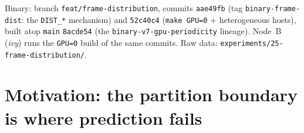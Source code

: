 \documentclass[
	english,
	letterpaper, oneside
]{article}
\begin{document}
\templatePagecfg
\templateFinalcfg

\inserttitle

\begin{center}\small\textsf{%
Binary: branch \texttt{feat/frame-distribution}, commits \texttt{aae49fb}
(tag \texttt{binary-frame-dist}: the \texttt{DIST\_*} mechanism) and
\texttt{52c40c4} (\texttt{make GPU=0} + heterogeneous hosts), built atop
\texttt{main} \texttt{8acde54} (the \texttt{binary-v7-gpu-periodicity}
lineage). Node~B (\emph{ivy}) runs the \texttt{GPU=0} build of the same
commits. Raw data: \texttt{experiments/25-frame-distribution/}.%
}\end{center}

\begin{abstract}
This report adds the first multi-machine axis to the renderer: frames of the
interpolated sequence are distributed \emph{across} nodes by a static
cyclic/block-cyclic predicate (three environment variables, one line in the
frame loop), while the region-level work queue stays intra-node and
untouched. Correctness is settled first: on the production spec (100 frames,
$1920\times1080$, \texttt{diffT}\,=\,0.1), every executor-pinned check ---
three simulated local nodes in CPU-only cyclic, GPU-only cyclic, and CPU-only
block-cyclic(8), plus a real two-machine run over SSH --- reproduces the
single-process output \textbf{100/100 frames byte-identical}, including
across compilers and microarchitectures (g++-15/Coffee~Lake vs.\
g++~16/Haswell). The benchmark is the honest half: against a laptop-alone
baseline of $18.75\pm0.34$~s, \emph{every} two-node static configuration
loses --- best $28.24\pm0.58$~s ($+51\%$), worst $65.12$~s --- because the
second node is $4.56\times$ slower per frame and equal shares strand the wall
on it. The ceiling is analytic: a perfectly weighted split would reach only
$15.4$~s ($1.22\times$), and the measured $3.4$--$4.2$~s ship/collect
overhead consumes most of that. Static distribution needs near-homogeneous
nodes; a slow node buys capacity, not latency.
\end{abstract}

\section{Motivation: the partition boundary is where prediction fails}
\label{sec:motivation}
\end{document}
